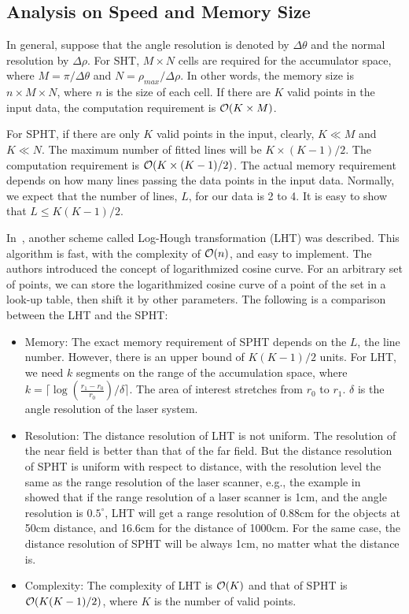 \documentclass[twocolumn]{IEEEtran}
\begin{document}
\subsection{Analysis on Speed and Memory Size}
\label{sec23}

In general, suppose that the angle resolution is denoted by $\Delta\theta$ and the normal resolution by  $\Delta\rho$. For SHT, $M\times N$ cells are required for the accumulator space, where $ M = \pi/\Delta\theta $ and  $N=\rho_{max}/\Delta\rho.$
In other words, the   memory size is $n\times M\times N$, where $n$ is the size of each cell.
If there are $K$ valid points in the input data, the computation requirement is ${\cal O}(K\times M)$.

For SPHT, if there are only $K$ valid points in the input, clearly, $K\ll M$ and $ K \ll N$. The maximum number of fitted lines will be $ K\times (K-1)/2$. The computation requirement is ${\cal O}(K\times (K-1)/2) $. The actual memory requirement depends on how many lines passing the data points in the input data. Normally, we expect that the number of lines, $L$, for our data is 2 to 4. It is easy to show that $L\leq K(K-1)/2$. 

In~\cite{GieslerLogHough}, another scheme called Log-Hough transformation (LHT) was described. This algorithm is fast, with the complexity of ${\cal O}(n)$, and easy to implement. The authors introduced the concept of logarithmized cosine curve. For an arbitrary set of points, we can store the logarithmized cosine curve of a point of the set in a look-up table, then shift it by other parameters. The following is a comparison between the LHT  and the SPHT:\\
\begin{itemize}
    \item Memory: The exact memory requirement of SPHT depends on the $L$, the line number. However, there is an upper bound of $K(K-1)/2$ units. For LHT, we need $k$ segments on the range of the accumulation space, where $ k=\lceil \log(\frac{r_1-r_0}{r_0})/\delta\rceil.$ The area of interest stretches from $r_0$ to $r_1$. $\delta$ is the angle resolution of the laser system.
    \item Resolution: The distance resolution of LHT is not uniform. The resolution of the near field is better than that of the far field. But the distance resolution of SPHT is uniform with respect to distance, with the resolution level the same as the range resolution of the laser scanner, e.g., the example in~\cite{GieslerLogHough} showed that if the range resolution of a laser scanner is 1cm, and the angle resolution is $0.5^\circ$, LHT will get a range resolution of 0.88cm for the objects at 50cm distance, and 16.6cm for the distance of 1000cm. For the same case, the distance resolution of SPHT will be always 1cm, no matter what the distance is.
    \item Complexity: The complexity of LHT is ${\cal O}(K)$ and that of SPHT is ${\cal O}(K(K-1)/2)$, where $K$ is the number of valid points. 
\end{itemize}    
\end{document}
